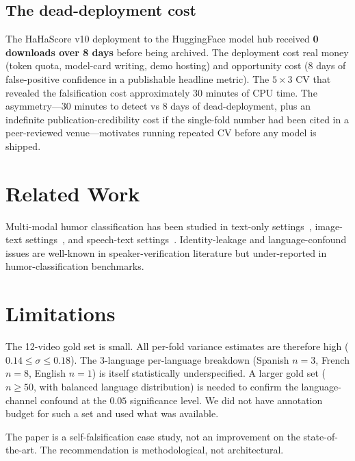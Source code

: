 \documentclass[11pt, letterpaper]{article}
\begin{document}
\subsection{The dead-deployment cost}

The HaHaScore v10 deployment to the HuggingFace model hub received
\textbf{0 downloads over 8 days} before being archived. The deployment cost
real money (token quota, model-card writing, demo hosting) and opportunity
cost (8 days of false-positive confidence in a publishable headline metric).
The $5\times3$ CV that revealed the falsification cost approximately 30
minutes of CPU time. The asymmetry---30 minutes to detect vs 8 days of
dead-deployment, plus an indefinite publication-credibility cost if the
single-fold number had been cited in a peer-reviewed venue---motivates
running repeated CV before any model is shipped.

\section{Related Work}

Multi-modal humor classification has been studied in text-only
settings~\cite{CNNhumor,weller-2020-humor}, image-text settings~\cite{MMGCN,
vilbert}, and speech-text settings~\cite{standup4ai, gated_multimodal}.
Identity-leakage and language-confound issues are well-known in
speaker-verification literature but under-reported in humor-classification
benchmarks.

\section{Limitations}

The 12-video gold set is small. All per-fold variance estimates are therefore
high ($0.14 \leq \sigma \leq 0.18$). The 3-language per-language breakdown
(Spanish $n=3$, French $n=8$, English $n=1$) is itself statistically
underspecified. A larger gold set ($n \geq 50$, with balanced language
distribution) is needed to confirm the language-channel confound at the
$0.05$ significance level. We did not have annotation budget for such a set
and used what was available.

The paper is a self-falsification case study, not an improvement on the
state-of-the-art. The recommendation is methodological, not architectural.
\end{document}

